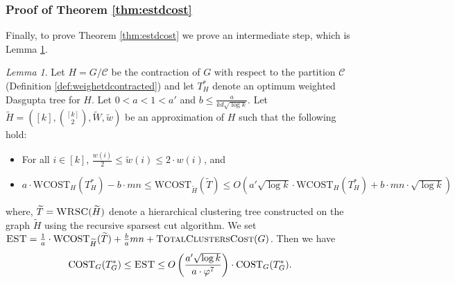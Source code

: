 \documentclass[letterpaper,11pt]{article}
\newcommand{\CT}{\text{COST}}
\newcommand{\wCT}{\text{WCOST}}
\newcommand{\estg}{\textsc{EST}}
\newcommand{\cC}{\mathcal{C}}
\theoremstyle{plain}
\theoremstyle{definition}
\theoremstyle{remark}
\newtheorem{lemmma}{Lemma}
\newcommand{\wt}[1]{\widetilde{#1}}
\begin{document}
\subsubsection{Proof of Theorem \ref{thm:estdcost}} \label{sec:proof:prepros}

Finally, to prove Theorem \ref{thm:estdcost}  we prove an intermediate step, which is Lemma \ref{lem:general:apx:cost}.


\begin{lemmma} \label{lem:general:apx:cost}
	Let $H = G/\cC$ be the contraction of $G$ with respect to the partition $\cC $ (Definition \ref{def:weighetdcontracted}) 
	and let $T^*_H$ denote an optimum weighted Dasgupta tree for $H$. Let $0 < a < 1 < a'$ and 
	$b \leq  \frac{a}{k d \sqrt{\log k}}$. Let  
	$\widetilde{H}= \left([k], {[k] \choose 2}, \widetilde{W}, \widetilde{w}\right)$ 
	be an approximation of $H$ such that the following hold: 

	\begin{itemize}[leftmargin=*]
		\item For all $i\in[k]$, $ \frac{w(i)}{2}\leq \wt{w}(i) \leq 2 \cdot w(i)$, and 
		\item $a \cdot \wCT_{H}(T^*_{H}) - b \cdot mn \leq \wCT_{\wt{H}}(\widetilde{T}) \leq O\left(a' \sqrt{\log k} \cdot \wCT_{H}(T^*_{H}) + b \cdot mn \cdot \sqrt{\log k}\right)$
	\end{itemize}
	where, $\widetilde{T} = \textsc{WRSC}(\widetilde{H})$ denote a hierarchical clustering tree constructed on the 
	graph $\widetilde{H}$ using the recursive sparsest cut algorithm.
	We set $\estg = \frac{1}{a} \cdot \wCT_{\wt{H}}(\wt{T}) + \frac{b}{a} mn + \textsc{TotalClustersCost}(G)$.
	Then we have
	\[\CT_G(T^*_G) \leq \estg \leq O\left(\frac{a'\sqrt{\log k}}{a\cdot \varphi^7}\right)\cdot \CT_G(T^*_G)\text{.}\]
\end{lemmma}
\end{document}
